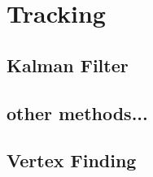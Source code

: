 \chapter{Tracking}

\section{Kalman Filter}

\section{other methods...}

\section{Vertex Finding}




